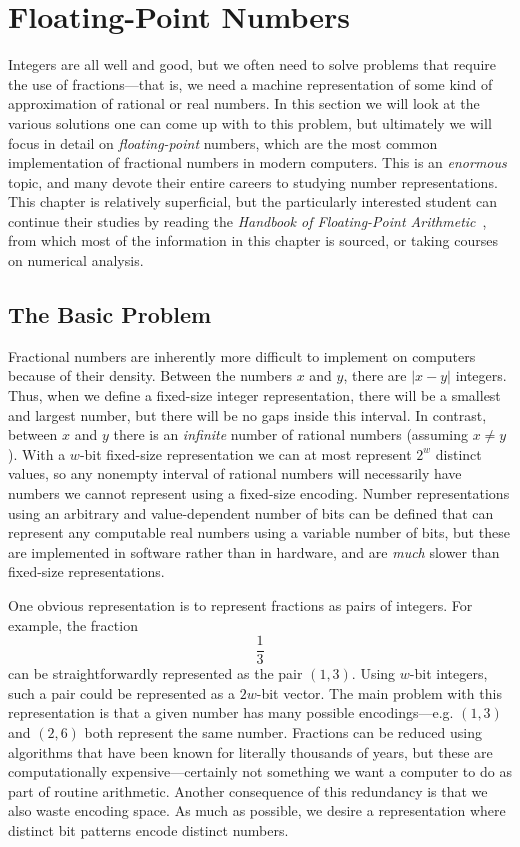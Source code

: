 \chapter{Floating-Point Numbers}
\label{chap:floats}

Integers are all well and good, but we often need to solve problems
that require the use of fractions---that is, we need a machine
representation of some kind of approximation of rational or real
numbers.  In this section we will look at the various solutions one
can come up with to this problem, but ultimately we will focus in
detail on \emph{floating-point} numbers, which are the most common
implementation of fractional numbers in modern computers.  This is an
\emph{enormous} topic, and many devote their entire careers to
studying number representations.  This chapter is relatively
superficial, but the particularly interested student can continue
their studies by reading the \emph{Handbook of Floating-Point
  Arithmetic}~\cite{muller2018handbook}, from which most of the
information in this chapter is sourced, or taking courses on numerical
analysis.

\section{The Basic Problem}

Fractional numbers are inherently more difficult to implement on
computers because of their density.  Between the numbers $x$ and $y$,
there are $|x-y|$ integers.  Thus, when we define a fixed-size integer
representation, there will be a smallest and largest number, but there
will be no gaps inside this interval.  In contrast, between $x$ and
$y$ there is an \emph{infinite} number of rational numbers (assuming
$x\neq y$).  With a $w$-bit fixed-size representation we can at most
represent $2^{w}$ distinct values, so any nonempty interval of
rational numbers will necessarily have numbers we cannot represent
using a fixed-size encoding.  Number representations using an
arbitrary and value-dependent number of bits can be defined that can
represent any computable real numbers using a variable number of bits,
but these are implemented in software rather than in hardware, and are
\emph{much} slower than fixed-size representations.

One obvious representation is to represent fractions as pairs of
integers.  For example, the fraction
\[
  \frac{1}{3}
\]
can be straightforwardly represented as the pair $(1,3)$.  Using
$w$-bit integers, such a pair could be represented as a $2w$-bit
vector.  The main problem with this representation is that a given
number has many possible encodings---e.g. $(1,3)$ and $(2,6)$ both
represent the same number.  Fractions can be reduced using algorithms
that have been known for literally thousands of years, but these are
computationally expensive---certainly not something we want a computer
to do as part of routine arithmetic.  Another consequence of this
redundancy is that we also waste encoding space.  As much as possible,
we desire a representation where distinct bit patterns encode distinct
numbers.

